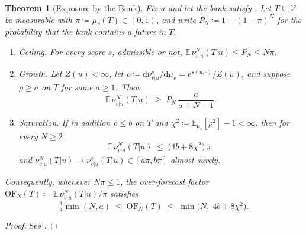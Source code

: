 \documentclass[11pt]{article}
\theoremstyle{plain}
\newtheorem{theorem}{Theorem}[section]
\theoremstyle{definition}
\theoremstyle{remark}
\newcommand{\E}{\mathbb{E}}
\newcommand{\VV}{\mathcal{V}}
\newcommand{\Dd}{\mathrm{d}}
\newcommand{\define}{\coloneqq}
\begin{document}
\begin{theorem}[Exposure by the Bank]
 \label{thm:exposure}
 Fix $u$ and let the bank satisfy . Let $T\subseteq\VV$ be
 measurable with $\pi\define\mu_v(T)\in(0,1)$, and write
 $P_N\define1-(1-\pi)^{N}$ for the probability that the bank contains a future
 in $T$.
 \begin{enumerate}[label=(\roman*)]
  \item \emph{Ceiling.} For every score $s$, admissible or not,
        $\E\,\nu^{N}_{v\vert u}(T\vert u)\le P_N\le N\pi$.
  \item \emph{Growth.} Let $Z(u)<\infty$, let
        $\rho\define\Dd\nu^{s}_{v\vert u}/\Dd\mu_v=e^{s(u,\cdot)}/Z(u)$, and
        suppose $\rho\ge a$ on $T$ for some $a\ge1$. Then
        \begin{equation}
         \E\,\nu^{N}_{v\vert u}(T\vert u)\;\ge\;P_N\,\frac{a}{a+N-1}.
         \label{eq:growth}
        \end{equation}
  \item \emph{Saturation.} If in addition $\rho\le b$ on $T$ and
        $\chi^{2}\define\E_{\mu_v}[\rho^{2}]-1<\infty$, then for every $N\ge2$
        \begin{equation}
         \E\,\nu^{N}_{v\vert u}(T\vert u)\;\le\;\bigl(4b+8\chi^{2}\bigr)\,\pi,
         \label{eq:saturation}
        \end{equation}
        and $\nu^{N}_{v\vert u}(T\vert u)\to\nu^{s}_{v\vert u}(T\vert u)\in[a\pi,b\pi]$
        almost surely.
 \end{enumerate}
 Consequently, whenever $N\pi\le1$, the \emph{over-forecast factor}
 $\mathrm{OF}_N(T)\define\E\,\nu^{N}_{v\vert u}(T\vert u)/\pi$ satisfies
 \begin{equation}
  \tfrac14\min(N,a)\;\le\;\mathrm{OF}_N(T)\;\le\;\min\bigl(N,\;4b+8\chi^{2}\bigr).
  \label{eq:minlaw}
 \end{equation}
\end{theorem}
\begin{proof}
 See .
\end{proof}
\end{document}
